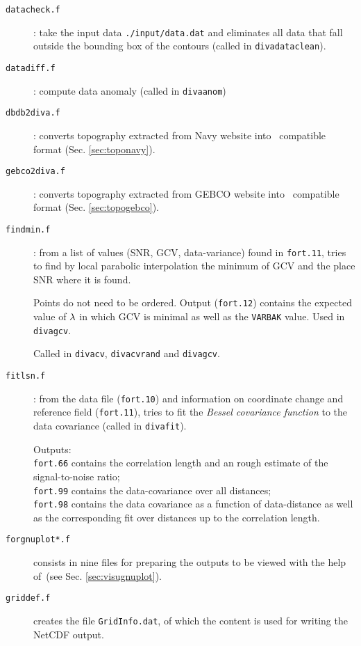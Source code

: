 \begin{description}
\item[\texttt{datacheck.f}]: take the input data \texttt{./input/data.dat} and eliminates 
all data that fall outside the bounding box of the contours (called in \texttt{divadataclean}). 

\item[\texttt{datadiff.f}]: compute data anomaly (called in \texttt{divaanom})


\item[\texttt{dbdb2diva.f}]: converts topography extracted from Navy website into \diva\, compatible format (Sec. \ref{sec:toponavy}).

\item[\texttt{gebco2diva.f}]: converts topography extracted from GEBCO website into \diva\, compatible format (Sec. \ref{sec:topogebco}).


\item[\texttt{findmin.f}]: from a list of values (SNR, GCV, data-variance) found in \texttt{fort.11}, tries 
to find by local parabolic interpolation the minimum of GCV and the place SNR where it is found.

Points do not need to be ordered. Output (\texttt{fort.12}) contains the 
expected value of $\lambda$ in which GCV is minimal as well as the \texttt{VARBAK} 
value. Used in \texttt{divagcv}.

Called in \texttt{divacv}, \texttt{divacvrand} and \texttt{divagcv}.


\item[\texttt{fitlsn.f}]: from the data file (\texttt{fort.10}) and information on coordinate change and 
reference field (\texttt{fort.11}), tries to fit the \textit{Bessel covariance function} to the data covariance (called in \texttt{divafit}).


Outputs:\\
\texttt{fort.66} contains the correlation length and an rough estimate of the signal-to-noise ratio;\\
\texttt{fort.99} contains the data-covariance over all distances;\\ 
\texttt{fort.98} contains the data covariance as a function of data-distance as well as the corresponding fit over distances up to the correlation length.

\item[\texttt{forgnuplot*.f}] consists in nine files for preparing the outputs to be viewed with the help of \gnuplot\,(see Sec. \ref{sec:visugnuplot}). 

\item[\texttt{griddef.f}] creates the file \texttt{GridInfo.dat}, of which the content is used for writing the NetCDF output.


\end{description}
